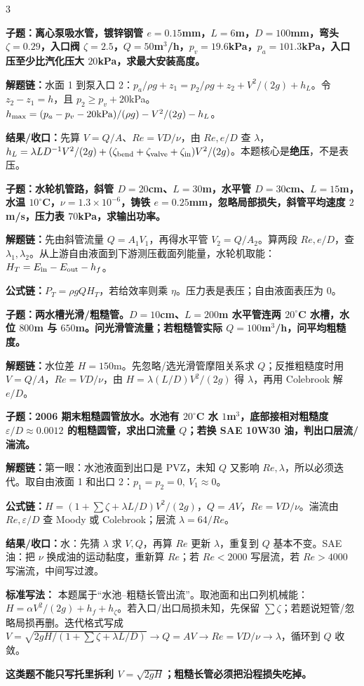 \documentclass[a4paper]{article}
\newcommand{\qt}[1]{\vspace{0.25pt}\colorbox{Q}{\parbox{\dimexpr\linewidth-2\fboxsep}{\color{white}\bfseries #1}}\par}
\newcommand{\ans}[1]{\colorbox{G}{\parbox{\dimexpr\linewidth-2\fboxsep}{#1}}\par}
\newcommand{\warn}[1]{\colorbox{Y}{\parbox{\dimexpr\linewidth-2\fboxsep}{\color{E}\bfseries #1}}\par}
\newcommand{\chain}[1]{{\color{A}\bfseries 解题链：}#1\par}
\newcommand{\res}[1]{{\color{E}\bfseries 结果/收口：}#1\par}
\newcommand{\form}[1]{{\color{M}\bfseries 公式链：}#1\par}
\begin{document}
\begin{multicols}{3}
\qt{子题：离心泵吸水管，镀锌钢管 $e=0.15$mm，$L=6$m，$D=100$mm，弯头 $\zeta=0.29$，入口阀 $\zeta=2.5$，$Q=50$m$^3$/h，$p_v=19.6$kPa，$p_a=101.3$kPa，入口压至少比汽化压大 $20$kPa，求最大安装高度。}
\chain{水面 1 到泵入口 2：$p_a/\rho g+z_1=p_2/\rho g+z_2+V^2/(2g)+h_L$。令 $z_2-z_1=h$，且 $p_2\ge p_v+20$kPa。$h_{\max}=(p_a-p_v-20{\rm kPa})/(\rho g)-V^2/(2g)-h_L$。}
\res{先算 $V=Q/A$、$Re=VD/\nu$，由 $Re,e/D$ 查 $\lambda$，$h_L=\lambda LD^{-1}V^2/(2g)+(\zeta_{\rm bend}+\zeta_{\rm valve}+\zeta_{\rm in}) V^2/(2g)$。本题核心是\textbf{绝压}，不是表压。}

\qt{子题：水轮机管路，斜管 $D=20$cm、$L=30$m，水平管 $D=30$cm、$L=15$m，水温 $10^\circ$C，$\nu=1.3\times10^{-6}$，铸铁 $e=0.25$mm，忽略局部损失，斜管平均速度 $2$m/s，压力表 $70$kPa，求输出功率。}
\chain{先由斜管流量 $Q=A_1V_1$，再得水平管 $V_2=Q/A_2$。算两段 $Re,e/D$，查 $\lambda_1,\lambda_2$。从上游自由液面到下游测压截面列能量，水轮机取能：$H_T=E_{\rm in}-E_{\rm out}-h_f$。}
\form{$P_T=\rho gQH_T$，若给效率则乘 $\eta$。压力表是表压；自由液面表压为 0。}

\qt{子题：两水槽光滑/粗糙管。$D=10$cm、$L=200$m 水平管连两 $20^\circ$C 水槽，水位 $800$m 与 $650$m。问光滑管流量；若粗糙管实际 $Q=100$m$^3$/h，问平均粗糙度。}
\chain{水位差 $H=150$m。先忽略/选光滑管摩阻关系求 $Q$；反推粗糙度时用 $V=Q/A$，$Re=VD/\nu$，由 $H=\lambda(L/D)V^2/(2g)$ 得 $\lambda$，再用 Colebrook 解 $e/D$。}

\qt{子题：2006 期末粗糙圆管放水。水池有 $20^\circ$C 水 $1$m$^3$，底部接相对粗糙度 $\varepsilon/D\approx0.0012$ 的粗糙圆管，求出口流量 $Q$；若换 SAE 10W30 油，判出口层流/湍流。}
\chain{第一眼：水池液面到出口是 PVZ，未知 $Q$ 又影响 $Re,\lambda$，所以必须迭代。取自由液面 1 和出口 2：$p_1=p_2=0,\ V_1\approx0$。}
\form{$H=\left(1+\sum\zeta+\lambda L/D\right)V^2/(2g)$，$Q=AV$，$Re=VD/\nu$。湍流由 $Re,\varepsilon/D$ 查 Moody 或 Colebrook；层流 $\lambda=64/Re$。}
\res{水：先猜 $\lambda$ 求 $V,Q$，再算 $Re$ 更新 $\lambda$，重复到 $Q$ 基本不变。SAE 油：把 $\nu$ 换成油的运动黏度，重新算 $Re$；若 $Re<2000$ 写层流，若 $Re>4000$ 写湍流，中间写过渡。}
\ans{\textbf{标准写法：} 本题属于“水池--粗糙长管出流”。取池面和出口列机械能：$H=\alpha V^2/(2g)+h_f+h_\zeta$。若入口/出口局损未知，先保留 $\sum\zeta$；若题说短管/忽略局损再删。迭代格式写成 $V=\sqrt{2gH/(1+\sum\zeta+\lambda L/D)}\to Q=AV\to Re=VD/\nu\to\lambda$，循环到 $Q$ 收敛。}
\warn{这类题不能只写托里拆利 $V=\sqrt{2gH}$；粗糙长管必须把沿程损失吃掉。}


\end{multicols}
\end{document}
